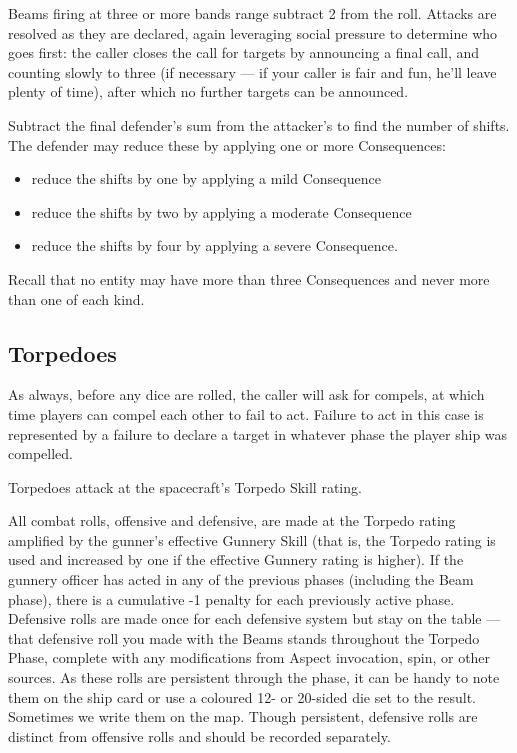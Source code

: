 Beams firing at three or more bands range subtract 2 from the roll. Attacks are resolved as they are declared, again leveraging social pressure to determine who goes first: the caller closes the call for targets by announcing a final call, and counting slowly to three (if necessary --- if your caller is fair and fun, he'll leave plenty of time), after which no further targets can be announced.

Subtract the final defender's sum from the attacker's to find the number of shifts. The defender may reduce these by applying one or more Consequences:
\begin{itemize}
\item reduce the shifts by one by applying a mild Consequence
\item reduce the shifts by two by applying a moderate Consequence
\item reduce the shifts by four by applying a severe Consequence.
\end{itemize}

Recall that no entity may have more than three Consequences and never more than one of each kind.

\subsection{Torpedoes}\label{sec:Torpedoes} %

As always, before any dice are rolled, the caller will ask for compels, at which time players can compel each other to fail to act. Failure to act in this case is represented by a failure to declare a target in whatever phase the player ship was compelled.

Torpedoes attack at the spacecraft's Torpedo Skill rating.

All combat rolls, offensive and defensive, are made at the Torpedo rating amplified by the gunner's effective Gunnery Skill (that is, the Torpedo rating is used and increased by one if the effective Gunnery rating is higher). If the gunnery officer has acted in any of the previous phases (including the Beam phase), there is a cumulative -1 penalty for each previously active phase. Defensive rolls are made once for each defensive system but stay on the table --- that  defensive roll you made with the Beams stands throughout the Torpedo Phase, complete with any modifications from Aspect invocation, spin, or other sources. As these rolls are persistent through the phase, it can be handy to note them on the ship card or use a coloured 12- or 20-sided die set to the result. Sometimes we write them on the map. Though persistent, defensive rolls are distinct from offensive rolls and should be recorded separately.

